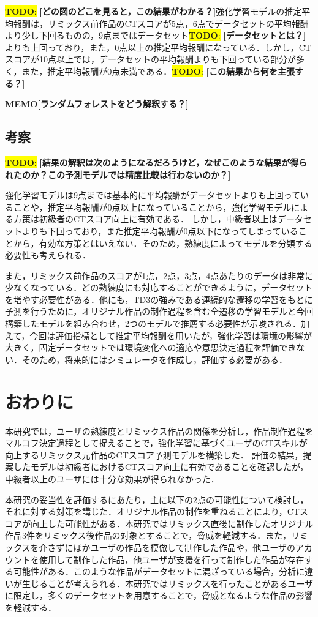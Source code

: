 \documentclass[submit,techrep,noauthor]{ipsj}
\newcommand{\todo}[1]{\colorbox{yellow}{{\bf TODO}:}{\color{red} {\textbf{[#1]}}}}
\newcommand{\memo}[1]{\colorbox{magenta!30}{\textbf{MEMO}}{\color{red!50}\textbf{[#1]}}}
\begin{document}
\todo{どの図のどこを見ると，この結果がわかる？}強化学習モデルの推定平均報酬は，リミックス前作品のCTスコアが5点，6点でデータセットの平均報酬より少し下回るものの，9点まではデータセット\todo{データセットとは？}よりも上回っており，また，0点以上の推定平均報酬になっている．しかし，CTスコアが10点以上では，データセットの平均報酬よりも下回っている部分が多く，また，推定平均報酬が0点未満である．\todo{この結果から何を主張する？}

\memo{ランダムフォレストをどう解釈する？}

\subsection{考察}
\todo{結果の解釈は次のようになるだろうけど，なぜこのような結果が得られたのか？この予測モデルでは精度比較は行わないのか？}

強化学習モデルは9点までは基本的に平均報酬がデータセットよりも上回っていることや，推定平均報酬が0点以上になっていることから，強化学習モデルによる方策は初級者のCTスコア向上に有効である．
しかし，中級者以上はデータセットよりも下回っており，また推定平均報酬が0点以下になってしまっていることから，有効な方策とはいえない．そのため，熟練度によってモデルを分類する必要性も考えられる．

また，リミックス前作品のスコアが1点，2点，3点，4点あたりのデータは非常に少なくなっている．どの熟練度にも対応することができるように，データセットを増やす必要性がある．他にも，TD3の強みである連続的な遷移の学習をもとに予測を行うために，オリジナル作品の制作過程を含む全遷移の学習モデルと今回構築したモデルを組み合わせ，2つのモデルで推薦する必要性が示唆される．加えて，今回は評価指標として推定平均報酬を用いたが，強化学習は環境の影響が大きく，固定データセットでは環境変化への適応や意思決定過程を評価できない．そのため，将来的にはシミュレータを作成し，評価する必要がある．


\section{おわりに}
\label{sec:conclusion}
本研究では，ユーザの熟練度とリミックス作品の関係を分析し，作品制作過程をマルコフ決定過程として捉えることで，強化学習に基づくユーザのCTスキルが向上するリミックス元作品のCTスコア予測モデルを構築した．
評価の結果，提案したモデルは初級者におけるCTスコア向上に有効であることを確認したが，中級者以上のユーザには十分な効果が得られなかった．

本研究の妥当性を評価するにあたり，主に以下の2点の可能性について検討し，それに対する対策を講じた．オリジナル作品の制作を重ねることにより，CTスコアが向上した可能性がある．本研究ではリミックス直後に制作したオリジナル作品3件をリミックス後作品の対象とすることで，脅威を軽減する．また，リミックスを介さずにほかユーザの作品を模倣して制作した作品や，他ユーザのアカウントを使用して制作した作品，他ユーザが支援を行って制作した作品が存在する可能性がある．このような作品がデータセットに混ざっている場合，分析に違いが生じることが考えられる．本研究ではリミックスを行ったことがあるユーザに限定し，多くのデータセットを用意することで，脅威となるような作品の影響を軽減する．
\end{document}

